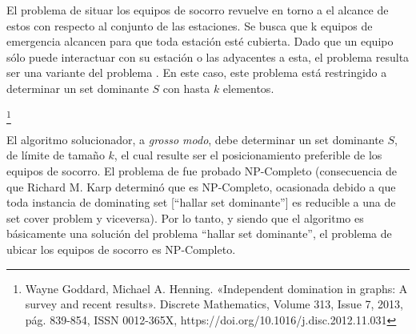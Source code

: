 \documentclass[../tp3_grupo404.tex]{subfiles}
\begin{document}
El problema de situar los equipos de socorro revuelve en torno a el alcance de estos con respecto
al conjunto de las estaciones. Se busca que k equipos de emergencia alcancen para que toda estación
esté cubierta. Dado que un equipo sólo puede interactuar con su estación o las adyacentes a esta,
el problema resulta ser una variante del problema .
En este caso, este problema está restringido a determinar un set dominante $S$ con hasta $k$ elementos.

\footnote{Wayne Goddard, Michael A. Henning. «Independent domination in graphs: A survey and recent results». Discrete Mathematics, Volume 313, Issue 7, 2013, pág. 839-854,
ISSN 0012-365X, https://doi.org/10.1016/j.disc.2012.11.031}

El algoritmo solucionador, a \emph{grosso modo}, debe determinar un set dominante $S$,
de límite de tamaño $k$, el cual resulte ser el posicionamiento preferible de los equipos de socorro.
El problema de  fue probado NP-Completo
(consecuencia de que Richard M. Karp determinó que  es NP-Completo,
ocasionada debido a que toda instancia de dominating set [“hallar set dominante”] es reducible a una
de set cover problem y viceversa).
Por lo tanto, y siendo que el algoritmo es básicamente una solución del problema “hallar set dominante”,
el problema de ubicar los equipos de socorro es NP-Completo.

\end{document}
